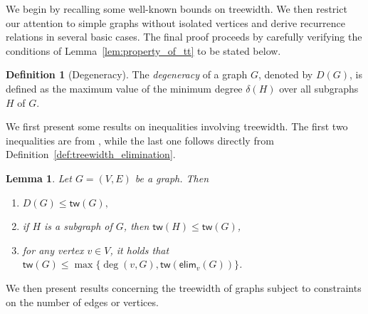 \documentclass[12pt]{article}
\theoremstyle{plain}
\newtheorem{lemma}{Lemma}
\theoremstyle{definition}
\newtheorem{definition}{Definition}
\newcommand{\degp}[2]{\deg(#1,#2)}
\newcommand{\treewidthp}[1]{\mathsf{tw}(#1)}
\newcommand{\degeneracy}{D}
\newcommand{\degeneracyg}[1]{\degeneracy(#1)}
\newcommand{\eliminatevg}[2]{\mathsf{elim}_{#1}(#2)}
\begin{document}
\begin{bibunit}[agsm]
We begin by recalling some well-known bounds on treewidth. We then restrict our attention to simple graphs without isolated vertices and derive recurrence relations in several basic cases. The final proof proceeds by carefully verifying the conditions of Lemma~\ref{lem:property_of_tt} to be stated below.

\begin{definition}[Degeneracy]
\label{def:degeracy}
The \emph{degeneracy} of a graph $G$, denoted by $\degeneracyg{G}$, is defined as the maximum value of the minimum degree $\delta(H)$ over all subgraphs $H$ of $G$.
\end{definition}

We first present some results on inequalities involving treewidth. The first two inequalities are from \citet{bodlaender2011treewidth}, while the last one follows directly from Definition~\ref{def:treewidth_elimination}.

\begin{lemma}
\label{lem:simple_bounds_on_treewidth}
Let $G = (V, E)$ be a graph. Then
\begin{enumerate}
    \item $ \degeneracyg{G} \leq \treewidthp{G},$
    
    \item if $H$ is a subgraph of $G$, then $\treewidthp{H} \leq \treewidthp{G}$, 
    
    \item for any vertex $v \in V$, it holds that $\treewidthp{G} \leq \max \{\degp{v}{G}, \treewidthp{\eliminatevg{v}{G}} \}$.
\end{enumerate}
\end{lemma}

We then present results concerning the treewidth of graphs subject to constraints on the number of edges or vertices.


\end{bibunit}
\end{document}
